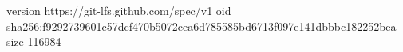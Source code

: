version https://git-lfs.github.com/spec/v1
oid sha256:f9292739601c57dcf470b5072cea6d785585bd6713f097e141dbbbc182252bea
size 116984
